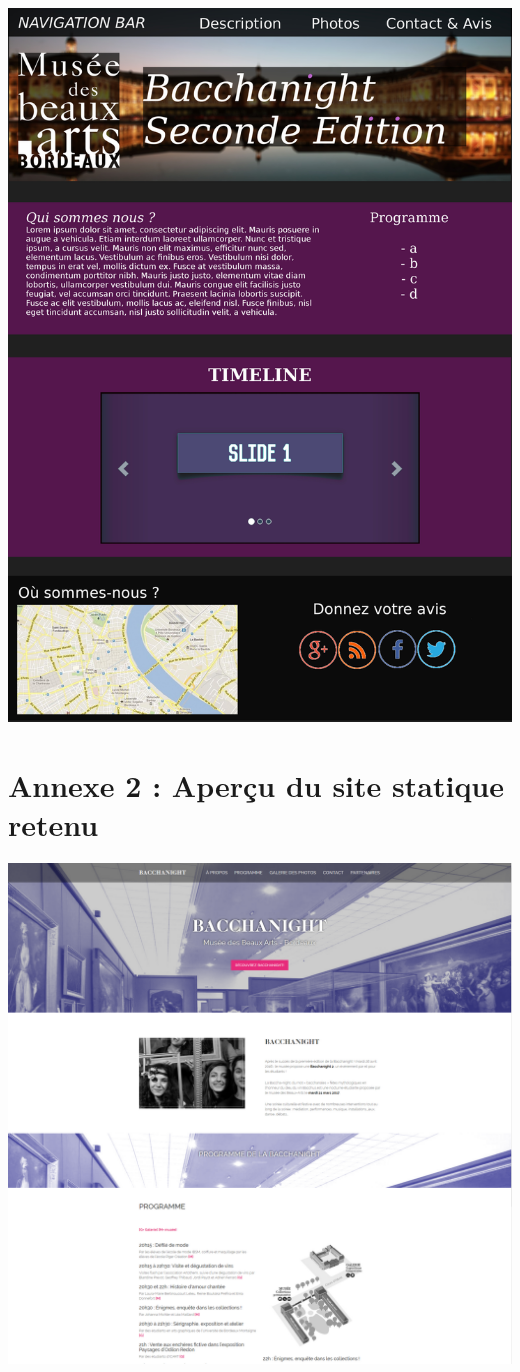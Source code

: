 \documentclass[11pt]{report}
\begin{document}
\vspace{0.4cm}
\includegraphics[scale=0.75]{maquette.jpg}

\section*{Annexe 2 : Aperçu du site statique retenu}

\vspace{0.4cm}
\includegraphics[width=\textwidth,height=\textheight,keepaspectratio]{preview2.png}
\end{document}
